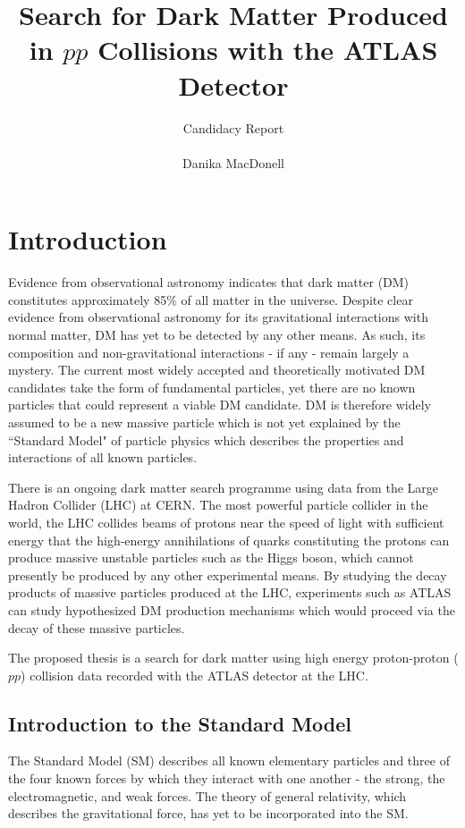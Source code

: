 \documentclass[12pt]{article}
\author{\Large{Candidacy Report} \\
\\
Danika MacDonell}
\title{Search for Dark Matter Produced in $pp$ Collisions with the ATLAS Detector}
\begin{document}
\maketitle

\section{Introduction}

Evidence from observational astronomy indicates that dark matter (DM) constitutes approximately 85\% \cite{planck} of all matter in the universe. Despite clear evidence from observational astronomy for its gravitational interactions with normal matter, DM has yet to be detected by any other means. As such, its composition and non-gravitational interactions - if any - remain largely a mystery. The current most widely accepted and theoretically motivated DM candidates take the form of fundamental particles, yet there are no known particles that could represent a viable DM candidate. DM is therefore widely assumed to be a new massive particle which is not yet explained by the ``Standard Model" of particle physics which describes the properties and interactions of all known particles. 

There is an ongoing dark matter search programme using data from the Large Hadron Collider (LHC) at CERN. The most powerful particle collider in the world, the LHC collides beams of protons near the speed of light with sufficient energy that the high-energy annihilations of quarks constituting the protons can produce massive unstable particles such as the Higgs boson, which cannot presently be produced by any other experimental means. By studying the decay products of massive particles produced at the LHC, experiments such as ATLAS can study hypothesized DM production mechanisms which would proceed via the decay of these massive particles. 

The proposed thesis is a search for dark matter using high energy proton-proton ($pp$) collision data recorded with the ATLAS detector at the LHC. 

\subsection{Introduction to the Standard Model}

The Standard Model (SM) describes all known elementary particles and three of the four known forces by which they interact with one another - the strong, the electromagnetic, and weak forces. The theory of general relativity, which describes the gravitational force, has yet to be incorporated into the SM. 
\end{document}
